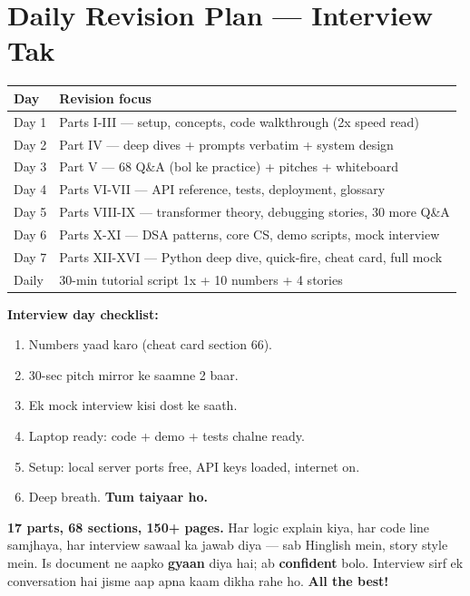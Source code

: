 \section{Daily Revision Plan --- Interview Tak}

\begin{longtable}{p{3.2cm} p{10.8cm}}
\toprule
\textbf{Day} & \textbf{Revision focus} \\
\midrule
Day 1 & Parts I-III --- setup, concepts, code walkthrough (2x speed read) \\
Day 2 & Part IV --- deep dives + prompts verbatim + system design \\
Day 3 & Part V --- 68 Q\&A (bol ke practice) + pitches + whiteboard \\
Day 4 & Parts VI-VII --- API reference, tests, deployment, glossary \\
Day 5 & Parts VIII-IX --- transformer theory, debugging stories, 30 more Q\&A \\
Day 6 & Parts X-XI --- DSA patterns, core CS, demo scripts, mock interview \\
Day 7 & Parts XII-XVI --- Python deep dive, quick-fire, cheat card, full mock \\
Daily & 30-min tutorial script 1x + 10 numbers + 4 stories \\
\bottomrule
\end{longtable}

\begin{memorybox}
\textbf{Interview day checklist:}
\begin{enumerate}[label=\arabic*.]
\item Numbers yaad karo (cheat card section 66).
\item 30-sec pitch mirror ke saamne 2 baar.
\item Ek mock interview kisi dost ke saath.
\item Laptop ready: code + demo + tests chalne ready.
\item Setup: local server ports free, API keys loaded, internet on.
\item Deep breath. \textbf{Tum taiyaar ho.}
\end{enumerate}
\end{memorybox}

\begin{storybox}
\textbf{17 parts, 68 sections, 150+ pages.} Har logic explain kiya, har code line samjhaya, har interview sawaal ka jawab diya --- sab Hinglish mein, story style mein. Is document ne aapko \textbf{gyaan} diya hai; ab \textbf{confident} bolo. Interview sirf ek conversation hai jisme aap apna kaam dikha rahe ho. \textbf{All the best!} \faGraduationCap
\end{storybox}

